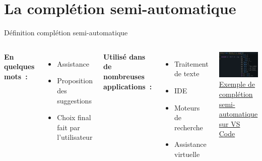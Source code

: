 
\section{La complétion semi-automatique}

\begin{frame}{Définition complétion semi-automatique}
	\begin{columns}
		
		\textbf{En quelques mots~:}
		\begin{itemize}
			\item Assistance
			\item Proposition des suggestions
			\item Choix final fait par l'utilisateur
		\end{itemize}
		\vfill	
		\textbf{Utilisé dans de nombreuses applications~:}
		\begin{itemize}
			\item Traitement de texte
			\item IDE
			\item Moteurs de recherche
			\item Assistance virtuelle
		\end{itemize}
		\includegraphics[width=\textwidth]{images/exemple_completion_semi_auto.png}
            \centering
		\uline{Exemple de complétion semi-automatique sur VS Code}
		
	\end{columns}
\end{frame}


